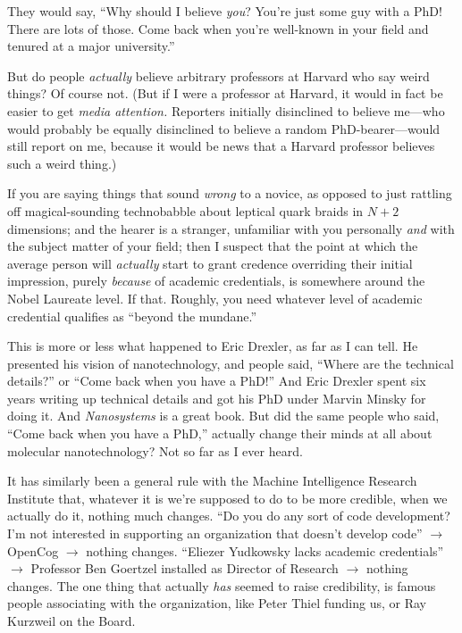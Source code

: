 {
 They would say, ``Why should I believe
\textit{you}? You're just some guy with a PhD! There
are lots of those. Come back when you're well-known in
your field and tenured at a major university.''}

{
 But do people \textit{actually} believe arbitrary professors at
Harvard who say weird things? Of course not. (But if I were a professor
at Harvard, it would in fact be easier to get \textit{media attention.}
Reporters initially disinclined to believe me---who would probably be
equally disinclined to believe a random PhD-bearer---would still report
on me, because it would be news that a Harvard professor believes such
a weird thing.)}

{
 If you are saying things that sound \textit{wrong} to a novice, as
opposed to just rattling off magical-sounding technobabble about
leptical quark braids in $N + 2$ dimensions; and the hearer is a
stranger, unfamiliar with you personally \textit{and} with the subject
matter of your field; then I suspect that the point at which the
average person will \textit{actually} start to grant credence
overriding their initial impression, purely \textit{because} of
academic credentials, is somewhere around the Nobel Laureate level. If
that. Roughly, you need whatever level of academic credential qualifies
as ``beyond the mundane.''}

{
 This is more or less what happened to Eric Drexler, as far as I
can tell. He presented his vision of nanotechnology, and people said,
``Where are the technical details?''
or ``Come back when you have a
PhD!'' And Eric Drexler spent six years writing up
technical details and got his PhD under Marvin Minsky for doing it. And
\textit{Nanosystems} is a great book. But did the same people who said,
``Come back when you have a PhD,''
actually change their minds at all about molecular nanotechnology? Not
so far as I ever heard.}

{
 It has similarly been a general rule with the Machine Intelligence
Research Institute that, whatever it is we're supposed
to do to be more credible, when we actually do it, nothing much
changes. ``Do you do any sort of code development?
I'm not interested in supporting an organization that
doesn't develop code'' $\rightarrow $
OpenCog $\rightarrow $ nothing changes. ``Eliezer
Yudkowsky lacks academic credentials'' $\rightarrow $
Professor Ben Goertzel installed as Director of Research $\rightarrow $
nothing changes. The one thing that actually \textit{has} seemed to
raise credibility, is famous people associating with the organization,
like Peter Thiel funding us, or Ray Kurzweil on the Board.}

